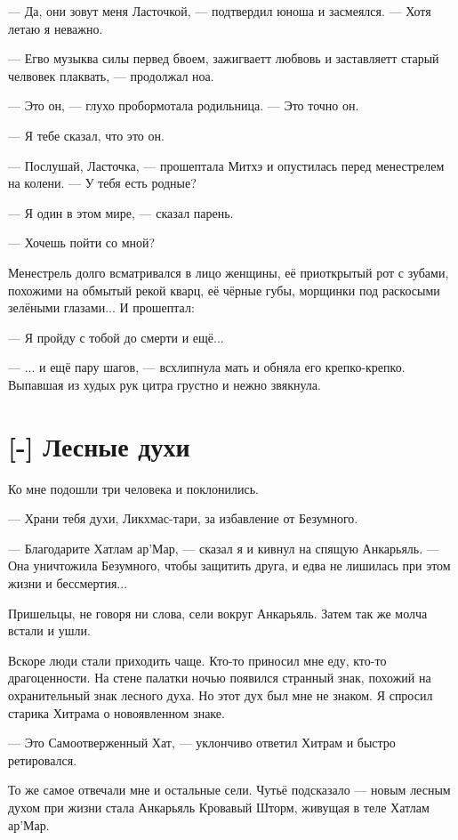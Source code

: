 --- Да, они зовут меня Ласточкой, --- подтвердил юноша и засмеялся.
--- Хотя летаю я неважно.

--- Егво музыква силы первед бвоем, зажигваетт любвовь и заставляетт старый челвовек плаквать, --- продолжал ноа.

--- Это он, --- глухо пробормотала родильница.
--- Это точно он.

--- Я тебе сказал, что это он.

--- Послушай, Ласточка, --- прошептала Митхэ и опустилась перед менестрелем на колени.
--- У тебя есть родные?

--- Я один в этом мире, --- сказал парень.

--- Хочешь пойти со мной?

Менестрель долго всматривался в лицо женщины, её приоткрытый рот с зубами, похожими на обмытый рекой кварц, её чёрные губы, морщинки под раскосыми зелёными глазами...
И прошептал:

--- Я пройду с тобой до смерти и ещё...

--- ... и ещё пару шагов, --- всхлипнула мать и обняла его крепко-крепко.
Выпавшая из худых рук цитра грустно и нежно звякнула.

\section{[-] Лесные духи}

\textspace

Ко мне подошли три человека и поклонились.

--- Храни тебя духи, Ликхмас-тари, за избавление от Безумного.

--- Благодарите Хатлам ар’Мар, --- сказал я и кивнул на спящую Анкарьяль.
--- Она уничтожила Безумного, чтобы защитить друга, и едва не лишилась при этом жизни и бессмертия...

Пришельцы, не говоря ни слова, сели вокруг Анкарьяль.
Затем так же молча встали и ушли.

Вскоре люди стали приходить чаще.
Кто-то приносил мне еду, кто-то драгоценности.
На стене палатки ночью появился странный знак, похожий на охранительный знак лесного духа.
Но этот дух был мне не знаком.
Я спросил старика Хитрама о новоявленном знаке.

--- Это Самоотверженный Хат, --- уклончиво ответил Хитрам и быстро ретировался.

То же самое отвечали мне и остальные сели.
Чутьё подсказало --- новым лесным духом при жизни стала Анкарьяль Кровавый Шторм, живущая в теле Хатлам ар’Мар.

